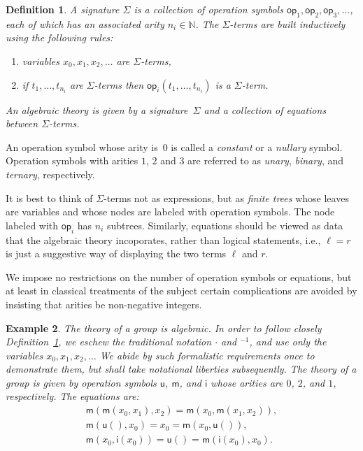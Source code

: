 \documentclass{amsart}
\newcommand{\NN}{\mathbb{N}}
\newcommand{\op}{\mathsf{op}}
\newtheorem{definition}{Definition}[section]
\newtheorem{example}[definition]{Example}
\begin{document}
\begin{definition}
  \label{def:algebraic-theory}
  A \emph{signature $\Sigma$} is a collection of \emph{operation symbols}
  $\op_1, \op_2, \op_3, \ldots$, each of which has an associated \emph{arity}
  $n_i \in \NN$. The \emph{$\Sigma$-terms} are built inductively using the following
  rules:
  \begin{enumerate}
  \item \emph{variables} $x_0, x_1, x_2, \ldots$ are $\Sigma$-terms,
  \item if $t_1, \ldots, t_{n_i}$ are $\Sigma$-terms then $\op_i(t_1, \ldots, t_{n_i})$ is
    a $\Sigma$-term.
  \end{enumerate}
  An \emph{algebraic theory} is given by a signature~$\Sigma$ and a collection of equations
  between $\Sigma$-terms.
\end{definition}

An operation symbol whose arity is~$0$ is called a \emph{constant} or a \emph{nullary}
symbol. Operation symbols with arities $1$, $2$ and $3$ are referred to as \emph{unary},
\emph{binary}, and \emph{ternary}, respectively.

It is best to think of $\Sigma$-terms not as expressions, but as \emph{finite trees} whose
leaves are variables and whose nodes are labeled with operation symbols. The node labeled
with $\op_i$ has $n_i$ subtrees. Similarly, equations should be viewed as data that the
algebraic theory incoporates, rather than logical statements, i.e., $\ell = r$ is just a
suggestive way of displaying the two terms $\ell$ and $r$.

We impose no restrictions on the number of operation symbols or equations, but at least in
classical treatments of the subject certain complications are avoided by insisting that
arities be non-negative integers.

\begin{example}
  The theory of a group is algebraic. In order to follow closely
  Definition~\ref{def:algebraic-theory}, we eschew the traditional notation $\cdot$ and
  ${}^{-1}$, and use only the variables $x_0, x_1, x_2, \ldots$ We abide by such
  formalistic requirements once to demonstrate them, but shall take notational
  liberties subsequently.
  The theory of a group is given by operation symbols $\mathsf{u}$, $\mathsf{m}$, and
  $\mathsf{i}$ whose arities are $0$, $2$, and $1$, respectively. The equations are:
  \begin{gather*}
    \mathsf{m}(\mathsf{m}(x_0, x_1), x_2) = \mathsf{m}(x_0, \mathsf{m}(x_1, x_2)),\\
    \mathsf{m}(\mathsf{u}(), x_0) = x_0 = \mathsf{m}(x_0, \mathsf{u}()),\\
    \mathsf{m}(x_0, \mathsf{i}(x_0)) = \mathsf{u}() = \mathsf{m}(\mathsf{i}(x_0), x_0).
  \end{gather*}
\end{example}
\end{document}
